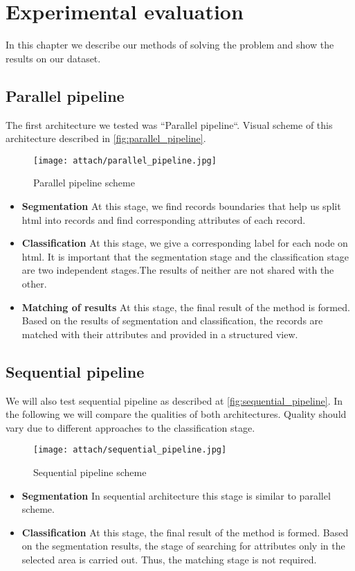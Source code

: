 \section{Experimental evaluation}
In this chapter we describe our methods of solving the problem and show the results on our dataset.
\subsection{Parallel pipeline}
The first architecture we tested was ``Parallel pipeline``. Visual scheme of this architecture described in \autoref{fig:parallel_pipeline}.
\begin{figure}[!htb]
    \centering
    \texttt{[image: attach/parallel\_pipeline.jpg]}
    \caption{Parallel pipeline scheme}
    \label{fig:parallel_pipeline}
\end{figure}
\begin{itemize}
    \item \textbf{Segmentation} At this stage, we find records boundaries that help us split html into records and find corresponding attributes of each record.
    \item \textbf{Classification} At this stage, we give a corresponding label for each node on html. It is important that the segmentation stage and the classification stage are two independent stages.The results of neither are not shared with the other.
    \item \textbf{Matching of results} At this stage, the final result of the method is formed. Based on the results of segmentation and classification, the records are matched with their attributes and provided in a structured view.
\end{itemize}

\subsection{Sequential pipeline}
We will also test sequential pipeline as described at \autoref{fig:sequential_pipeline}. In the following we will compare the qualities of both architectures. Quality should vary due to different approaches to the classification stage.
\begin{figure}[!htb]
    \centering
    \texttt{[image: attach/sequential\_pipeline.jpg]}
    \caption{Sequential pipeline scheme}
    \label{fig:sequential_pipeline}
\end{figure}
\begin{itemize}
    \item \textbf{Segmentation} In sequential architecture this stage is similar to parallel scheme.
    \item \textbf{Classification} At this stage, the final result of the method is formed. Based on the segmentation results, the stage of searching for attributes only in the selected area is carried out. Thus, the matching stage is not required.
\end{itemize}


